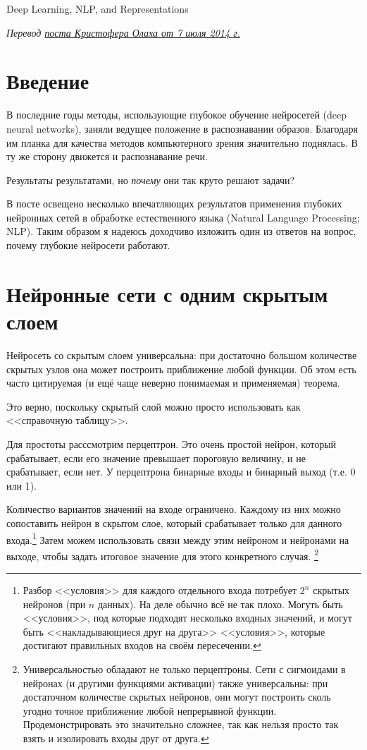 \documentclass[a4paper,12pt]{article}
\begin{document}
{\LARGE Deep Learning, NLP, and Representations }
\bigskip

{\it Перевод \href{http://colah.github.io/posts/2014-07-NLP-RNNs-Representations/}{поста Кристофера Олаха от 7 июля 2014 г.}}
\section*{Введение}

В последние годы методы, использующие глубокое обучение нейросетей (deep neural networks), заняли ведущее положение в распознавании образов. Благодаря им планка для качества методов компьютерного зрения значительно поднялась. В ту же сторону движется и распознавание речи.

Результаты результатами, но {\it почему} они так круто решают задачи?

В посте освещено несколько впечатляющих результатов применения глубоких нейронных сетей в обработке естественного языка (Natural Language Processing; NLP). Таким образом я надеюсь доходчиво изложить один из ответов на вопрос, почему глубокие нейросети работают.

\section*{Нейронные сети с одним скрытым слоем}

Нейросеть со скрытым слоем универсальна: при достаточно большом количестве скрытых узлов она может построить приближение любой функции. Об этом есть часто цитируемая (и ещё чаще неверно понимаемая и применяемая) теорема.

Это верно, поскольку скрытый слой можно просто использовать как <<справочную таблицу>>.

Для простоты расссмотрим перцептрон. Это очень простой нейрон, который срабатывает, если его значение превышает пороговую величину, и не срабатывает, если нет. У перцептрона бинарные входы и бинарный выход (т.е. 0 или 1).

Количество вариантов значений на входе ограничено. Каждому из них можно сопоставить нейрон в скрытом слое, который срабатывает только для данного входа.\footnote{Разбор <<условия>> для каждого отдельного входа потребует $2^n$ скрытых нейронов (при $n$ данных). На деле обычно всё не так плохо. Могуть быть <<условия>>, под которые подходят несколько входных значений, и могут быть <<накладывающиеся друг на друга>> <<условия>>, которые  достигают правильных входов на своём пересечении. } Затем можем использовать связи между этим нейроном и нейронами на выходе, чтобы задать итоговое значение для этого конкретного случая. \footnote{Универсальностью обладают не только перцептроны. Сети с сигмоидами в нейронах (и другими функциями активации) также универсальны: при достаточном количестве скрытых нейронов, они могут построить сколь угодно точное приближение любой непрерывной функции. Продемонстрировать это значительно сложнее, так как нельзя просто так взять и изолировать входы друг от друга.}
\end{document}
